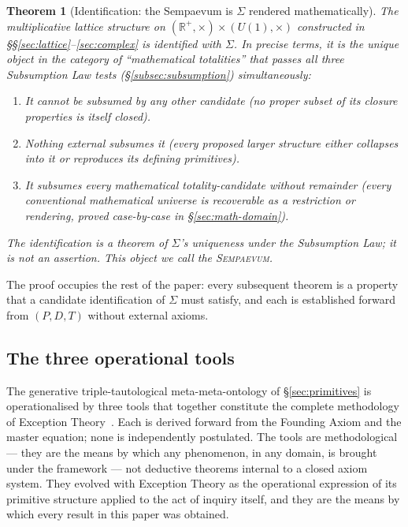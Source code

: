 \documentclass[11pt,a4paper]{article}
\newtheorem{theorem}{Theorem}[section]
\theoremstyle{definition}
\theoremstyle{remark}
\newcommand{\R}{\mathbb{R}}
\newcommand{\Sempaevum}{\textnormal{\textsc{Sempaevum}}}
\begin{document}
\begin{theorem}[Identification: the Sempaevum is $\Sigma$ rendered mathematically]\label{thm:identification-Sigma}
The multiplicative lattice structure on $(\R^{+},\times)\times (U(1),\times)$ constructed in \S\S\ref{sec:lattice}--\ref{sec:complex} is identified with $\Sigma$. In precise terms, it is the unique object in the category of ``mathematical totalities'' that passes all three Subsumption Law tests (\S\ref{subsec:subsumption}) simultaneously:
\begin{enumerate}[label=(\roman*),leftmargin=*]
\item It cannot be subsumed by any other candidate (no proper subset of its closure properties is itself closed).
\item Nothing external subsumes it (every proposed larger structure either collapses into it or reproduces its defining primitives).
\item It subsumes every mathematical totality-candidate without remainder (every conventional mathematical universe is recoverable as a restriction or rendering, proved case-by-case in \S\ref{sec:math-domain}).
\end{enumerate}
The identification is a theorem of $\Sigma$'s uniqueness under the Subsumption Law; it is \emph{not} an assertion. This object we call the \Sempaevum.
\end{theorem}

The proof occupies the rest of the paper: every subsequent theorem is a property that a candidate identification of $\Sigma$ must satisfy, and each is established forward from $(P,D,T)$ without external axioms.


\subsection{The three operational tools}\label{subsec:three-tools}

The generative triple-tautological meta-meta-ontology of \S\ref{sec:primitives} is operationalised by three tools that together constitute the complete methodology of Exception Theory~\cite{ThreeTools}. Each is derived forward from the Founding Axiom and the master equation; none is independently postulated. The tools are methodological --- they are the means by which any phenomenon, in any domain, is brought under the framework --- not deductive theorems internal to a closed axiom system. They evolved with Exception Theory as the operational expression of its primitive structure applied to the act of inquiry itself, and they are the means by which every result in this paper was obtained.
\end{document}
